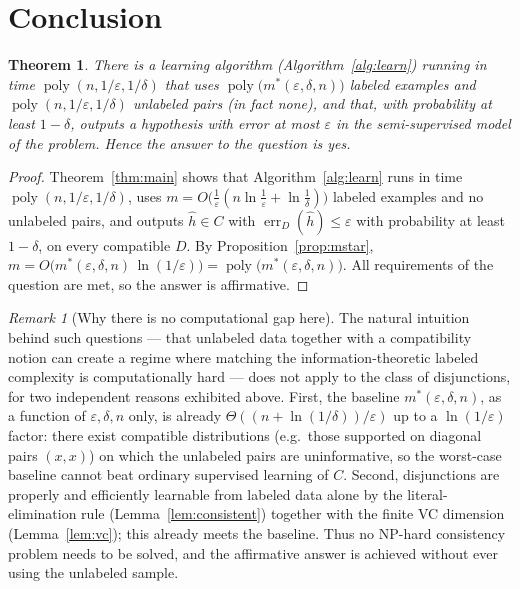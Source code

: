 \documentclass{amsart}
\newtheorem{theorem}{Theorem}
\theoremstyle{definition}
\theoremstyle{remark}
\newtheorem{remark}{Remark}
\newcommand{\eps}{\varepsilon}
\DeclareMathOperator*{\err}{err}
\DeclareMathOperator{\poly}{poly}
\begin{document}
\section{Conclusion}

\begin{theorem}
There is a learning algorithm (Algorithm~\ref{alg:learn}) running in time
$\poly(n,1/\eps,1/\delta)$ that uses $\poly\big(m^*(\eps,\delta,n)\big)$ labeled
examples and $\poly(n,1/\eps,1/\delta)$ unlabeled pairs (in fact none), and that,
with probability at least $1-\delta$, outputs a hypothesis with error at most
$\eps$ in the semi-supervised model of the problem. Hence the answer to the
question is \emph{yes}.
\end{theorem}

\begin{proof}
Theorem~\ref{thm:main} shows that Algorithm~\ref{alg:learn} runs in time
$\poly(n,1/\eps,1/\delta)$, uses
$m=O\big(\tfrac1\eps(n\ln\tfrac1\eps+\ln\tfrac1\delta)\big)$ labeled examples and
no unlabeled pairs, and outputs $\hat h\in C$ with $\err_D(\hat h)\le\eps$ with
probability at least $1-\delta$, on every compatible $D$. By
Proposition~\ref{prop:mstar}, $m=O\big(m^*(\eps,\delta,n)\,\ln(1/\eps)\big)
=\poly\big(m^*(\eps,\delta,n)\big)$. All requirements of the question are met, so
the answer is affirmative.
\end{proof}

\begin{remark}[Why there is no computational gap here]
The natural intuition behind such questions --- that unlabeled data together with
a compatibility notion can create a regime where matching the
information-theoretic labeled complexity is computationally hard --- does not
apply to the class of disjunctions, for two independent reasons exhibited above.
First, the baseline $m^*(\eps,\delta,n)$, as a function of $\eps,\delta,n$ only,
is already $\Theta((n+\ln(1/\delta))/\eps)$ up to a $\ln(1/\eps)$ factor: there
exist compatible distributions (e.g.\ those supported on diagonal pairs $(x,x)$)
on which the unlabeled pairs are uninformative, so the worst-case baseline cannot
beat ordinary supervised learning of $C$. Second, disjunctions are properly and
efficiently learnable from labeled data alone by the literal-elimination rule
(Lemma~\ref{lem:consistent}) together with the finite VC dimension
(Lemma~\ref{lem:vc}); this already meets the baseline. Thus no NP-hard
consistency problem needs to be solved, and the affirmative answer is achieved
without ever using the unlabeled sample.
\end{remark}
\end{document}
